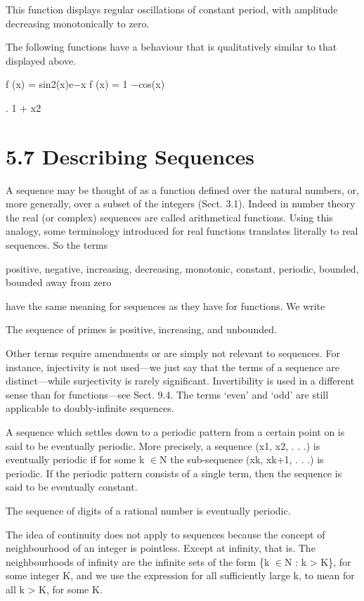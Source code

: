 \documentclass[11pt]{article}
\theoremstyle{plain}
\theoremstyle{definition}
\begin{document}
This function displays regular oscillations of constant period, with amplitude decreasing monotonically to zero.

The following functions have a behaviour that is qualitatively similar to that displayed above.

f (x) = sin2(x)e$-$x f (x) = 1 $-$cos(x)

. 1 + x2

\section{5.7 Describing Sequences}

A sequence may be thought of as a function defined over the natural numbers, or, more generally, over a subset of the integers (Sect. 3.1). Indeed in number theory the real (or complex) sequences are called arithmetical functions. Using this analogy, some terminology introduced for real functions translates literally to real sequences. So the terms

positive, negative, increasing, decreasing, monotonic, constant, periodic, bounded, bounded away from zero

have the same meaning for sequences as they have for functions. We write

The sequence of primes is positive, increasing, and unbounded.

Other terms require amendments or are simply not relevant to sequences. For instance, injectivity is not used---we just say that the terms of a sequence are distinct---while surjectivity is rarely significant. Invertibility is used in a different sense than for functions---see Sect. 9.4. The terms `even' and `odd' are still applicable to doubly-infinite sequences.

A sequence which settles down to a periodic pattern from a certain point on is said to be eventually periodic. More precisely, a sequence (x1, x2, . . .) is eventually periodic if for some k $\in$N the sub-sequence (xk, xk+1, . . .) is periodic. If the periodic pattern consists of a single term, then the sequence is said to be eventually constant.

The sequence of digits of a rational number is eventually periodic.

The idea of continuity does not apply to sequences because the concept of neighbourhood of an integer is pointless. Except at infinity, that is. The neighbourhoods of infinity are the infinite sets of the form \{k $\in$N : k > K\}, for some integer K, and we use the expression for all sufficiently large k, to mean for all k > K, for some K.
\end{document}
